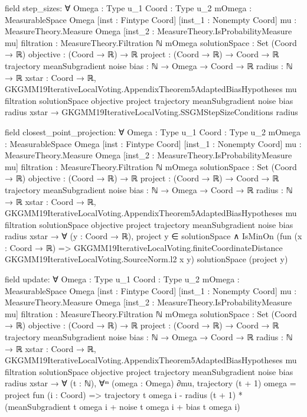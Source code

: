 \documentclass[10pt]{article}
\begin{document}
\begin{ReviewVerbatim}
field step_sizes:
∀ {Omega : Type u_1} {Coord : Type u_2} {mOmega : MeasurableSpace Omega} [inst : Fintype Coord]
  [inst_1 : Nonempty Coord] {mu : MeasureTheory.Measure Omega} [inst_2 : MeasureTheory.IsProbabilityMeasure mu]
  {filtration : MeasureTheory.Filtration ℕ mOmega} {solutionSpace : Set (Coord → ℝ)} {objective : (Coord → ℝ) → ℝ}
  {project : (Coord → ℝ) → Coord → ℝ} {trajectory meanSubgradient noise bias : ℕ → Omega → Coord → ℝ} {radius : ℕ → ℝ}
  {xstar : Coord → ℝ},
  GKGMM19IterativeLocalVoting.AppendixTheorem5AdaptedBiasHypotheses mu filtration solutionSpace objective project
      trajectory meanSubgradient noise bias radius xstar →
    GKGMM19IterativeLocalVoting.SSGMStepSizeConditions radius

field closest_point_projection:
∀ {Omega : Type u_1} {Coord : Type u_2} {mOmega : MeasurableSpace Omega} [inst : Fintype Coord]
  [inst_1 : Nonempty Coord] {mu : MeasureTheory.Measure Omega} [inst_2 : MeasureTheory.IsProbabilityMeasure mu]
  {filtration : MeasureTheory.Filtration ℕ mOmega} {solutionSpace : Set (Coord → ℝ)} {objective : (Coord → ℝ) → ℝ}
  {project : (Coord → ℝ) → Coord → ℝ} {trajectory meanSubgradient noise bias : ℕ → Omega → Coord → ℝ} {radius : ℕ → ℝ}
  {xstar : Coord → ℝ},
  GKGMM19IterativeLocalVoting.AppendixTheorem5AdaptedBiasHypotheses mu filtration solutionSpace objective project
      trajectory meanSubgradient noise bias radius xstar →
    ∀ (y : Coord → ℝ),
      project y ∈ solutionSpace ∧
        IsMinOn
          (fun (x : Coord → ℝ) =>
            GKGMM19IterativeLocalVoting.finiteCoordinateDistance GKGMM19IterativeLocalVoting.SourceNorm.l2 x y)
          solutionSpace (project y)

field update:
∀ {Omega : Type u_1} {Coord : Type u_2} {mOmega : MeasurableSpace Omega} [inst : Fintype Coord]
  [inst_1 : Nonempty Coord] {mu : MeasureTheory.Measure Omega} [inst_2 : MeasureTheory.IsProbabilityMeasure mu]
  {filtration : MeasureTheory.Filtration ℕ mOmega} {solutionSpace : Set (Coord → ℝ)} {objective : (Coord → ℝ) → ℝ}
  {project : (Coord → ℝ) → Coord → ℝ} {trajectory meanSubgradient noise bias : ℕ → Omega → Coord → ℝ} {radius : ℕ → ℝ}
  {xstar : Coord → ℝ},
  GKGMM19IterativeLocalVoting.AppendixTheorem5AdaptedBiasHypotheses mu filtration solutionSpace objective project
      trajectory meanSubgradient noise bias radius xstar →
    ∀ (t : ℕ),
      ∀ᵐ (omega : Omega) ∂mu,
        trajectory (t + 1) omega =
          project fun (i : Coord) =>
            trajectory t omega i - radius (t + 1) * (meanSubgradient t omega i + noise t omega i + bias t omega i)


\end{ReviewVerbatim}
\end{document}
